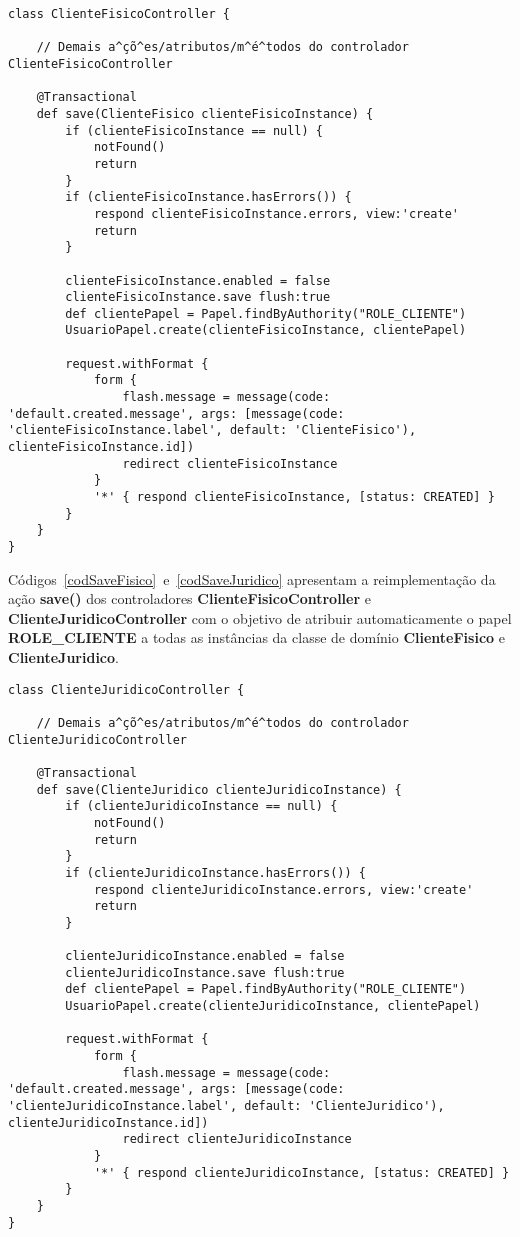 \begin{lstlisting}[caption=Controlador {\bf  ClienteFisico} (ação {\bf save()}),
    frame=trBL, float=htbp, label=codSaveFisico] 
class ClienteFisicoController {

    // Demais a^çõ^es/atributos/m^é^todos do controlador ClienteFisicoController

    @Transactional
    def save(ClienteFisico clienteFisicoInstance) {
        if (clienteFisicoInstance == null) {
            notFound()
            return
        }
        if (clienteFisicoInstance.hasErrors()) {
            respond clienteFisicoInstance.errors, view:'create'
            return
        }

        clienteFisicoInstance.enabled = false       
        clienteFisicoInstance.save flush:true
        def clientePapel = Papel.findByAuthority("ROLE_CLIENTE")
        UsuarioPapel.create(clienteFisicoInstance, clientePapel)
        
        request.withFormat {
            form {
                flash.message = message(code: 'default.created.message', args: [message(code: 'clienteFisicoInstance.label', default: 'ClienteFisico'), clienteFisicoInstance.id])
                redirect clienteFisicoInstance
            }
            '*' { respond clienteFisicoInstance, [status: CREATED] }
        }
    }
}
\end{lstlisting}

Códigos~\ref{codSaveFisico}~e~\ref{codSaveJuridico} apresentam a reimplementação
da  ação {\bf  save()} dos  controladores {\bf  ClienteFisicoController}  e {\bf
  ClienteJuridicoController} com o objetivo  de atribuir automaticamente o papel
{\bf  ROLE\_CLIENTE}   a  todas  as   instâncias  da  classe  de   domínio  {\bf
  ClienteFisico} e {\bf ClienteJuridico}.  

\begin{lstlisting}[caption=Controlador   {\bf    ClienteJuridico}   (ação   {\bf
      save()}), frame=trBL, float=htbp, label=codSaveJuridico] 
class ClienteJuridicoController {

    // Demais a^çõ^es/atributos/m^é^todos do controlador ClienteJuridicoController

    @Transactional
    def save(ClienteJuridico clienteJuridicoInstance) {
        if (clienteJuridicoInstance == null) {
            notFound()
            return
        }
        if (clienteJuridicoInstance.hasErrors()) {
            respond clienteJuridicoInstance.errors, view:'create'
            return
        }

        clienteJuridicoInstance.enabled = false
        clienteJuridicoInstance.save flush:true
        def clientePapel = Papel.findByAuthority("ROLE_CLIENTE")
        UsuarioPapel.create(clienteJuridicoInstance, clientePapel)
       
        request.withFormat {
            form {
                flash.message = message(code: 'default.created.message', args: [message(code: 'clienteJuridicoInstance.label', default: 'ClienteJuridico'), clienteJuridicoInstance.id])
                redirect clienteJuridicoInstance
            }
            '*' { respond clienteJuridicoInstance, [status: CREATED] }
        }
    }
}
\end{lstlisting}


